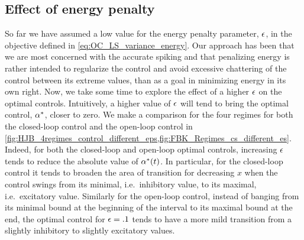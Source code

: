 \documentclass[12pt]{iopart}
\begin{document}
\subsection{Effect of energy penalty}
\label{sec:effect_of_eps}
So far we have assumed a low value for the energy penalty parameter,
${\epsilon}$, in the objective defined in \cref{eq:OC_LS_variance_energy}. Our
approach has been that we are most concerned with the accurate spiking and that
penalizing energy is rather intended to regularize the control and avoid
excessive chattering of the control between its extreme values, than as a goal
in minimizing energy in its own right. Now, we take some time to explore the
effect of a higher ${\epsilon}$ on the optimal controls. Intuitively, a
higher value of ${\epsilon}$ will tend to bring the optimal control, ${\alpha}^*$, closer
to zero. We make a comparison for the four regimes for both the
closed-loop control and the open-loop control in
\cref{fig:HJB_4regimes_control_different_eps,fig:FBK_Regimes_cs_different_es}.
Indeed, for both the closed-loop and open-loop optimal controls, increasing
${\epsilon}$ tends to reduce the absolute value of ${\alpha}^*(t)$. In particular, for the
closed-loop control it tends to broaden the area of transition for
decreasing $x$ when the control swings from its minimal, i.e.\ inhibitory value,
to its maximal, i.e.\ excitatory value. Similarly for the open-loop control,
instead of banging from its minimal bound at the beginning of the interval to
its maximal bound at the end, the optimal control for ${\epsilon} = .1$ tends to have a
more mild transition from a slightly inhibitory to slightly excitatory
values.
\end{document}
